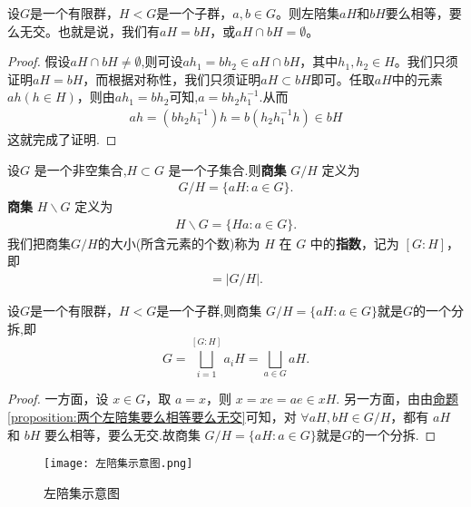 \documentclass[../../main.tex]{subfiles}
\begin{document}
\begin{proposition}\label{proposition:两个左陪集要么相等要么无交}
设$G$是一个有限群，$H < G$是一个子群，$a,b \in G$。则左陪集$aH$和$bH$要么相等，要么无交。也就是说，我们有$aH = bH$，或$aH \cap bH = \emptyset$。
\end{proposition}
\begin{proof}
假设$aH\cap bH \neq \emptyset$,则可设$ah_1 = bh_2 \in aH\cap bH$，其中$h_1,h_2 \in H$。我们只须证明$aH = bH$，而根据对称性，我们只须证明$aH \subset bH$即可。任取$aH$中的元素$ah (h \in H)$，则由$ah_1 = bh_2$可知,$a=bh_2h_1^{-1}$.从而
\begin{align*}
ah=(bh_2h_1^{-1})h = b(h_2h_1^{-1}h) \in bH
\end{align*}
这就完成了证明.

\end{proof}

\begin{definition}[商集]\label{definition:商集和其指数}
设\(G\) 是一个非空集合,\(H \subset G\) 是一个子集合.则\textbf{商集} \(G/H\) 定义为
\begin{align*}
G/H = \{aH : a \in G\}.
\end{align*}
\textbf{商集} \(H\backslash G\) 定义为
\begin{align*}
H\backslash G = \{Ha : a \in G\}.
\end{align*}
我们把商集\(G/H\)的大小(所含元素的个数)称为 \(H\) 在 \(G\) 中的\textbf{指数}，记为 \([G : H]\)，即
\begin{align*}
[G : H] = |G/H|.
\end{align*} 
\end{definition}

\begin{theorem}\label{theorem:商集G/H构成G的一个分拆}
设$G$是一个有限群，$H < G$是一个子群,则商集 \(G/H= \{aH : a \in G\}\)就是$G$的一个分拆,即
\[
G=\bigsqcup_{i=1}^{\left[ G:H \right]}{a_iH}=\bigsqcup_{a\in G}{aH}.
\]
\end{theorem}
\begin{proof}
一方面，设 \(x \in G\)，取 \(a = x\)，则 \(x = xe = ae \in xH\).
另一方面，由由\hyperref[proposition:两个左陪集要么相等要么无交]{命题\ref{proposition:两个左陪集要么相等要么无交}}可知，对 \(\forall aH, bH \in G/H\)，都有 \(aH\) 和 \(bH\) 要么相等，要么无交.故商集 \(G/H= \{aH : a \in G\}\)就是$G$的一个分拆.

\end{proof}
\begin{note}
\begin{figure}[H]
\centering
\texttt{[image: 左陪集示意图.png]}
\label{figure:左陪集示意图}
\caption{左陪集示意图}
\end{figure}
\end{note}
\end{document}
